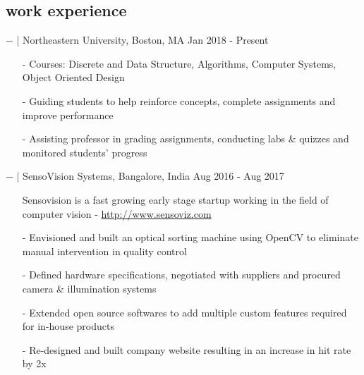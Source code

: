 \documentclass[a4paper, 10pt, oneside]{article}
\newcommand{\bulltetspace}{\vspace{-0.2em}}
\begin{document}
\begin{center}
\section{\color{headings}work experience}
\vspace{-0.5em}
$-$ \color{headings}{Teaching Assistant} | Northeastern University, Boston, MA \hfill Jan 2018 - Present
\vspace{-0.3em}
\begin{itemize} 
\bulltetspace
\item[-] Courses: Discrete and Data Structure, Algorithms, Computer Systems, Object Oriented Design\\
\bulltetspace
\color{text1}
\item[-] Guiding students to help reinforce concepts, complete assignments and improve performance\\
\bulltetspace
\item[-] Assisting professor in grading assignments, conducting labs \& quizzes and monitored students' progress\\
\end{itemize}

$-$ \color{headings}{Product Developer} | SensoVision Systems, Bangalore, India \hfill Aug 2016 - Aug 2017
\vspace{-0.3em}
\color{text1}
\begin{itemize}
\bulltetspace
\item[] Sensovision is a fast growing early stage startup working in the field of computer vision -  \href{http://sensoviz.com/}{http://www.sensoviz.com}\\
\bulltetspace
\item[-] Envisioned and built an optical sorting machine using \color{headings}OpenCV to eliminate manual intervention in quality control \\
\bulltetspace
\item[-] Defined hardware specifications, negotiated with suppliers and procured camera \& illumination systems \\
\bulltetspace
\item[-] Extended open source softwares to add multiple custom features required for in-house products\\
\bulltetspace
\item[-] Re-designed and built company website resulting in an increase in hit rate by 2x

\end{itemize}


\end{center}
\end{document}
